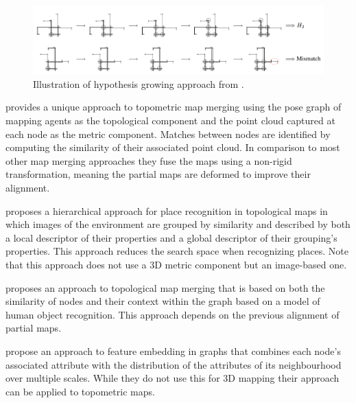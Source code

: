 \begin{figure}[h]
    \centering
    \includegraphics*[width=\textwidth]{./fig/huang_beevers.png}
    \caption{Illustration of hypothesis growing approach from \citep{huang_topological_2005}.}
    \label{fig:huang}
\end{figure}

\citet{bonanni_3-d_2017} provides a unique approach to topometric map merging using the pose graph of mapping agents as the topological component and the point cloud captured at each node as the metric component. Matches between nodes are identified by computing the similarity of their associated point cloud. In comparison to most other map merging approaches they fuse the maps using a non-rigid transformation, meaning the partial maps are deformed to improve their alignment. 

\citet{garcia-fidalgo_hierarchical_2017} proposes a hierarchical approach for place recognition in topological maps in which images of the environment are grouped by similarity and described by both a local descriptor of their properties and a global descriptor of their grouping's properties. This approach reduces the search space when recognizing places. Note that this approach does not use a 3D metric component but an image-based one.

\citet{rincon_map_2019} proposes an approach to topological map merging that is based on both the similarity of nodes and their context within the graph based on a model of human object recognition. This approach depends on the previous alignment of partial maps.

\citet{rozemberczki_multi-scale_2021} propose an approach to feature embedding in graphs that combines each node's associated attribute with the distribution of the attributes of its neighbourhood over multiple scales. While they do not use this for 3D mapping their approach can be applied to topometric maps.